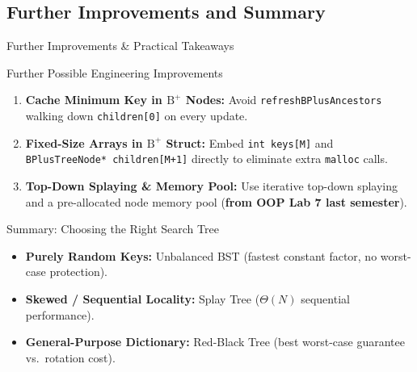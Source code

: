 \documentclass[aspectratio=169, 10pt, xcolor={x11names}]{beamer}
\newcommand{\code}[1]{\texttt{\color{primary!90!black}#1}}
\begin{document}
\subsection{Further Improvements and Summary}
\begin{frame}{Further Improvements \& Practical Takeaways}
\begin{block}{\footnotesize Further Possible Engineering Improvements}
\footnotesize
\begin{enumerate}\setlength{\itemsep}{0.3em}
  \item \textbf{Cache Minimum Key in $\text{B}^+$ Nodes:} Avoid \code{refreshBPlusAncestors} walking down \code{children[0]} on every update.
  \item \textbf{Fixed-Size Arrays in $\text{B}^+$ Struct:} Embed \code{int keys[M]} and \code{BPlusTreeNode* children[M+1]} directly to eliminate extra \code{malloc} calls.
  \item \textbf{Top-Down Splaying \& Memory Pool:} Use iterative top-down splaying and a pre-allocated node memory pool (\textbf{from OOP Lab 7 last semester}).
\end{enumerate}
\end{block}

\vspace{0.25em}
\begin{exampleblock}{\footnotesize Summary: Choosing the Right Search Tree}
\footnotesize
\begin{itemize}\setlength{\itemsep}{0.25em}
  \item \textbf{Purely Random Keys:} Unbalanced BST (fastest constant factor, no worst-case protection).
  \item \textbf{Skewed / Sequential Locality:} Splay Tree ($\Theta(N)$ sequential performance).
  \item \textbf{General-Purpose Dictionary:} Red-Black Tree (best worst-case guarantee vs.\ rotation cost).
\end{itemize}
\end{exampleblock}
\end{frame}
\end{document}
